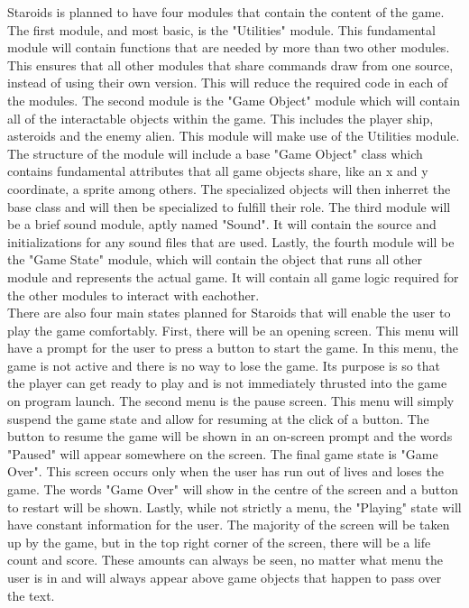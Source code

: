 \documentclass{article}
\begin{document}
Staroids is planned to have four modules that contain the content of the game. The first module, and most basic, is the "Utilities" module. This fundamental module will contain functions that are needed by more than two other modules. This ensures that all other modules that share commands draw from one source, instead of using their own version. This will reduce the required code in each of the modules. The second module is the "Game Object" module which will contain all of the interactable objects within the game. This includes the player ship, asteroids and the enemy alien. This module will make use of the Utilities module. The structure of the module will include a base "Game Object" class which contains fundamental attributes that all game objects share, like an x and y coordinate, a sprite among others. The specialized objects will then inherret the base class and will then be specialized to fulfill their role. The third module will be a brief sound module, aptly named "Sound". It will contain the source and initializations for any sound files that are used. Lastly, the fourth module will be the "Game State" module, which will contain the object that runs all other module and represents the actual game. It will contain all game logic required for the other modules to interact with eachother.\\
There are also four main states planned for Staroids that will enable the user to play the game comfortably. First, there will be an opening screen. This menu will have a prompt for the user to press a button to start the game. In this menu, the game is not active and there is no way to lose the game. Its purpose is so that the player can get ready to play and is not immediately thrusted into the game on program launch. The second menu is the pause screen. This menu will simply suspend the game state and allow for resuming at the click of a button. The button to resume the game will be shown in an on-screen prompt and the words "Paused" will appear somewhere on the screen. The final game state is "Game Over". This screen occurs only when the user has run out of lives and loses the game. The words "Game Over" will show in the centre of the screen and a button to restart will be shown. Lastly, while not strictly a menu, the "Playing" state will have constant information for the user. The majority of the screen will be taken up by the game, but in the top right corner of the screen, there will be a life count and score. These amounts can always be seen, no matter what menu the user is in and will always appear above game objects that happen to pass over the text.\\
\end{document}
